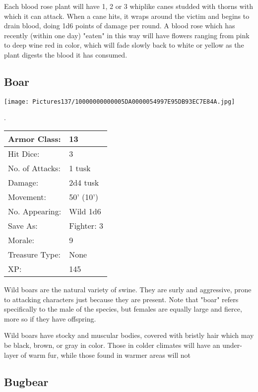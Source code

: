 \documentclass[a4paper,twoside,openany,10pt]{book}
\begin{document}
\begin{multicols}{2}
Each blood rose plant will have 1, 2 or 3 whiplike canes studded with thorns with which it can attack. When a cane hits, it wraps around the victim and begins to drain blood, doing 1d6 points of damage per round. A blood rose which has recently (within one day) "eaten" in this way will have flowers ranging from pink to deep wine red in color, which will fade slowly back to white or yellow as the plant digests the blood it has consumed.

\subsection*{Boar}\label{boar}


\begin{center}
	\texttt{[image: Pictures137/10000000000005DA0000054997E95DB93EC7E84A.jpg]}
\end{center}.

\begin{center}
	\begin{tabularx}{0.48\textwidth}{@{}lX@{}}
Armor Class: & 13 \\\hline
Hit Dice: & 3 \\\hline
No. of Attacks: & 1 tusk \\\hline
Damage: & 2d4 tusk \\\hline
Movement: & 50' (10') \\\hline
No. Appearing: & Wild 1d6 \\\hline
Save As: & Fighter: 3 \\\hline
Morale: & 9 \\\hline
Treasure Type: & None \\\hline
XP: & 145 \\\hline
\end{tabularx}\medskip

\end{center}
Wild
boars are the natural variety of swine. They are surly and aggressive, prone to attacking characters just because they are present. Note that "boar" refers specifically to the male of the species, but females are equally large and fierce, more so if they have offspring. 

Wild boars have stocky and muscular bodies, covered with bristly hair which may be black, brown, or gray in color. Those in colder climates will have an under-layer of warm fur, while those found in warmer areas will not

\subsection*{Bugbear}\label{bugbear}


\end{multicols}
\end{document}
